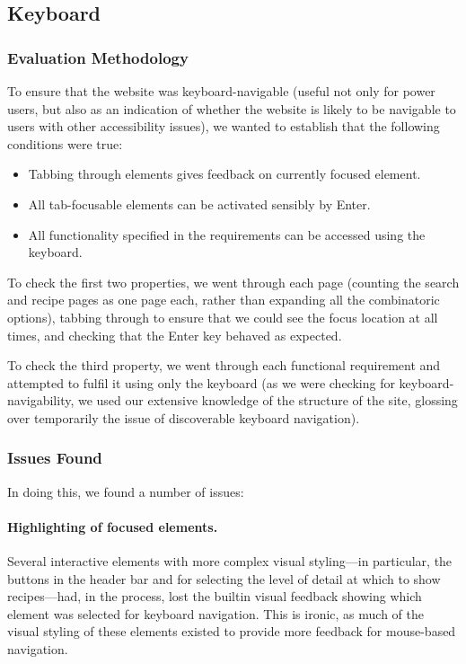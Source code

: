 \subsection{Keyboard}

\subsubsection{Evaluation Methodology}

To ensure that the website was keyboard-navigable (useful not only for
power users, but also as an indication of whether the website is
likely to be navigable to users with other accessibility issues), we
wanted to establish that the following conditions were true:

\begin{itemize}
\item Tabbing through elements gives feedback on currently focused
  element.
\item All tab-focusable elements can be activated sensibly by Enter.
\item All functionality specified in the requirements can be accessed
  using the keyboard.
\end{itemize}

To check the first two properties, we went through each page (counting
the search and recipe pages as one page each, rather than expanding
all the combinatoric options), tabbing through to ensure that we could
see the focus location at all times, and checking that the Enter key
behaved as expected.

To check the third property, we went through each functional
requirement and attempted to fulfil it using only the keyboard (as we
were checking for keyboard-navigability, we used our extensive
knowledge of the structure of the site, glossing over temporarily the
issue of discoverable keyboard navigation).

\subsubsection{Issues Found}

In doing this, we found a number of issues:

\paragraph{Highlighting of focused elements.}
Several interactive elements with more complex visual styling---in
particular, the buttons in the header bar and for selecting the level
of detail at which to show recipes---had, in the process, lost the
builtin visual feedback showing which element was selected for
keyboard navigation. This is ironic, as much of the visual styling of
these elements existed to provide more feedback for mouse-based
navigation.

